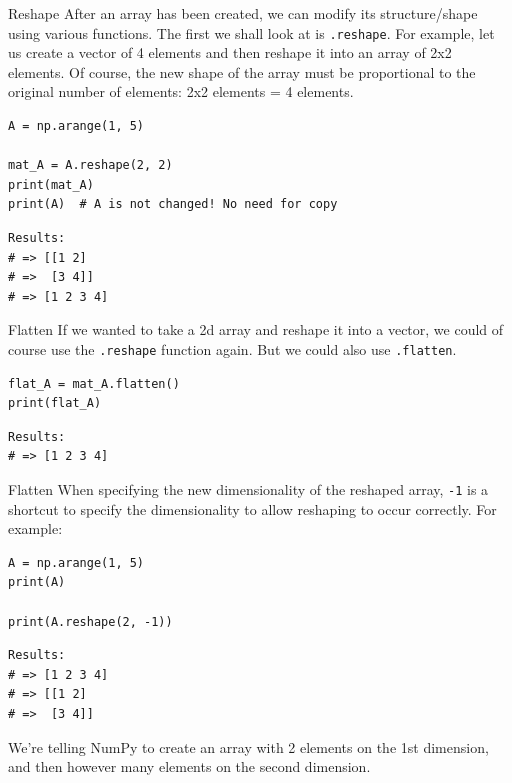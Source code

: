 \documentclass[10pt]{beamer}
\begin{document}
\begin{frame}[label={sec:org81185ae},fragile]{Reshape}
 After an array has been created, we can modify its structure/shape using various
functions. The first we shall look at is \texttt{.reshape}. For example, let us create a
vector of 4 elements and then reshape it into an array of 2x2 elements. Of course,
the new shape of the array must be proportional to the original number of elements:
2x2 elements = 4 elements.

\begin{verbatim}
A = np.arange(1, 5)

mat_A = A.reshape(2, 2)
print(mat_A)
print(A)  # A is not changed! No need for copy
\end{verbatim}

\begin{verbatim}
Results: 
# => [[1 2]
# =>  [3 4]]
# => [1 2 3 4]
\end{verbatim}
\end{frame}

\begin{frame}[label={sec:org85ab33a},fragile]{Flatten}
 If we wanted to take a 2d array and reshape it into a vector, we could of course use
the \texttt{.reshape} function again. But we could also use \texttt{.flatten}.

\begin{verbatim}
flat_A = mat_A.flatten()
print(flat_A)
\end{verbatim}

\begin{verbatim}
Results: 
# => [1 2 3 4]
\end{verbatim}
\end{frame}

\begin{frame}[label={sec:org59b742b},fragile]{Flatten}
 When specifying the new dimensionality of the reshaped array, \texttt{-1} is a shortcut to
specify the dimensionality to allow reshaping to occur correctly. For example:

\begin{verbatim}
A = np.arange(1, 5)
print(A)

print(A.reshape(2, -1))
\end{verbatim}

\begin{verbatim}
Results: 
# => [1 2 3 4]
# => [[1 2]
# =>  [3 4]]
\end{verbatim}


We're telling NumPy to create an array with 2 elements on the 1st dimension, and then
however many elements on the second dimension.
\end{frame}
\end{document}
